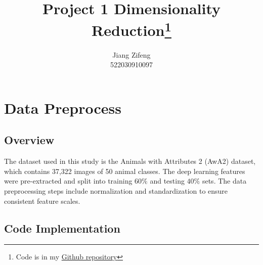 \documentclass[lang=cn]{elegantpaper}
\author{Jiang Zifeng\\522030910097}
\date{}
\title{Project 1 Dimensionality Reduction\footnote{Code is in my \href{https://github.com/Angzif/CS3319-PROJECT1}{Github repository}}}
\begin{document}
\maketitle

\section{Data Preprocess}

\subsection{Overview}
The dataset used in this study is the Animals with Attributes 2 (AwA2) dataset, which contains 37,322 images of 50 animal classes. The deep learning features were pre-extracted and split into training \(60\%\) and testing \(40\%\) sets. The data preprocessing steps include normalization and standardization to ensure consistent feature scales.

\subsection{Code Implementation}
\end{document}
